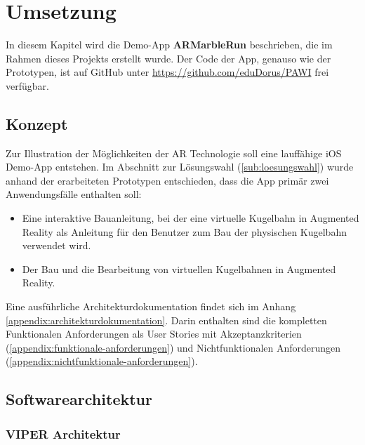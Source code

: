 \section{Umsetzung}

In diesem Kapitel wird die Demo-App \textbf{ARMarbleRun} beschrieben, die im Rahmen dieses Projekts erstellt wurde.
Der Code der App, genauso wie der Prototypen, ist auf GitHub unter \url{https://github.com/eduDorus/PAWI} frei verfügbar.

\subsection{Konzept}

Zur Illustration der Möglichkeiten der AR Technologie soll eine lauffähige iOS Demo-App entstehen.
Im Abschnitt zur Lösungswahl (\ref{sub:loesungswahl}) wurde anhand der erarbeiteten Prototypen entschieden, dass die App primär zwei Anwendungsfälle enthalten soll:

\begin{itemize}
	\item Eine interaktive Bauanleitung, bei der eine virtuelle Kugelbahn in Augmented Reality als Anleitung für den Benutzer zum Bau der physischen Kugelbahn verwendet wird.
	\item Der Bau und die Bearbeitung von virtuellen Kugelbahnen in Augmented Reality.
\end{itemize}

Eine ausführliche Architekturdokumentation findet sich im Anhang \ref{appendix:architekturdokumentation}.
Darin enthalten sind die kompletten Funktionalen Anforderungen als User Stories mit Akzeptanzkriterien (\ref{appendix:funktionale-anforderungen}) und Nichtfunktionalen Anforderungen (\ref{appendix:nichtfunktionale-anforderungen}).




\subsection{Softwarearchitektur}

\subsubsection{VIPER Architektur}

